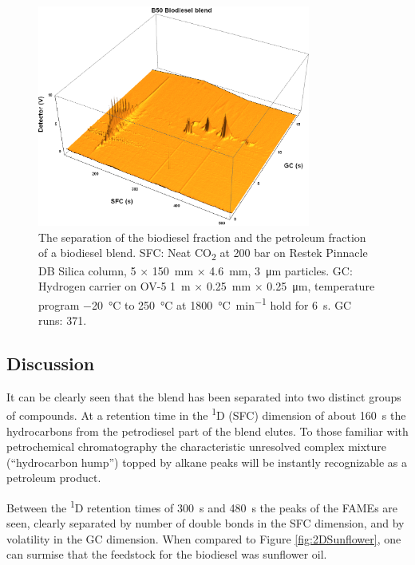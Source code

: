 \begin{figure}
	\centering
	\includegraphics[width=0.8\textwidth]{Figures/B50.png}
	\decoRule	
	
\caption[Biodiesel separated from petrodiesel.]{The separation of the biodiesel
fraction and the petroleum fraction of a biodiesel blend. SFC: Neat
CO\textsubscript{2} at 200 bar on Restek Pinnacle DB Silica column, 5 × \SI{150}{\milli\metre} ×
\SI{4.6}{\milli\metre}, \SI{3}{\micro\metre} particles. GC: Hydrogen carrier on
OV-5 \SI{1}{\metre} × \SI{0.25}{\milli\metre} × \SI{0.25}{\micro\metre},
temperature program \SI{-20}{\celsius} to \SI{250}{\celsius} at
\SI{1800}{\celsius\per\minute} hold for \SI{6}{\second}. GC runs: 371.}

	
	\label{fig:B50} 
\end{figure}

\subsection{Discussion}

It can be clearly seen that the blend has been separated into two distinct
groups of compounds. At a retention time in the \textsuperscript{1}D (SFC)
dimension of about \SI{160}{\second} the hydrocarbons from the petrodiesel part
of the blend elutes. To those familiar with petrochemical chromatography the
characteristic unresolved complex mixture (``hydrocarbon hump'') topped by
alkane peaks will be instantly recognizable as a petroleum product.

Between the \textsuperscript{1}D retention times of \SI{300}{\second} and
\SI{480}{\second} the peaks of the FAMEs are seen, clearly separated by number
of double bonds in the SFC dimension, and by volatility in the GC dimension.
When compared to Figure \ref{fig:2DSunflower}, one can surmise that the
feedstock for the biodiesel was sunflower oil.

